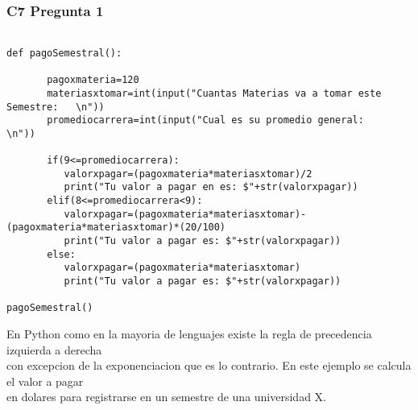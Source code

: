 \subsubsection{C7 Pregunta 1}

\begin{lstlisting}

def pagoSemestral():

       pagoxmateria=120
       materiasxtomar=int(input("Cuantas Materias va a tomar este Semestre:   \n"))
       promediocarrera=int(input("Cual es su promedio general:    \n"))
       
       if(9<=promediocarrera):
          valorxpagar=(pagoxmateria*materiasxtomar)/2
          print("Tu valor a pagar en es: $"+str(valorxpagar))
       elif(8<=promediocarrera<9):
          valorxpagar=(pagoxmateria*materiasxtomar)-(pagoxmateria*materiasxtomar)*(20/100)
          print("Tu valor a pagar es: $"+str(valorxpagar))
       else:
          valorxpagar=(pagoxmateria*materiasxtomar)
          print("Tu valor a pagar es: $"+str(valorxpagar))
             
pagoSemestral()

 \end{lstlisting}
En Python como en la mayoria de lenguajes existe la regla de precedencia izquierda a derecha \\
con excepcion de la exponenciacion que es lo contrario. En este ejemplo se calcula el valor a pagar \\
en dolares para registrarse en un semestre de una universidad X.
